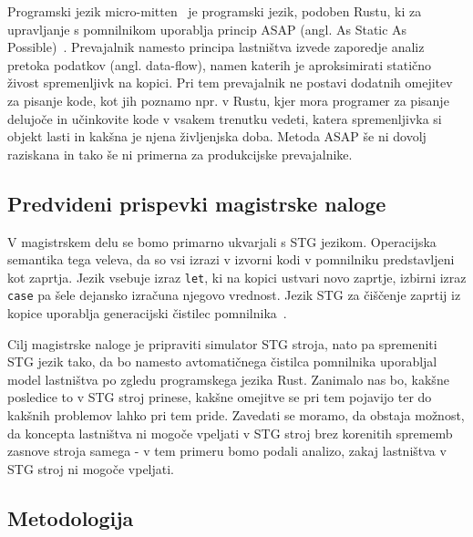 \documentclass[a4paper, 12pt]{article}
\begin{document}

Programski jezik micro-mitten~\cite{corbyn:practical-static-memory-management} je programski jezik, podoben Rustu, ki za upravljanje s pomnilnikom uporablja princip ASAP (angl. As Static As Possible)~\cite{proust2017asap}. Prevajalnik namesto principa lastništva izvede zaporedje analiz pretoka podatkov (angl. data-flow), namen katerih je aproksimirati statično živost spremenljivk na kopici. Pri tem prevajalnik ne postavi dodatnih omejitev za pisanje kode, kot jih poznamo npr. v Rustu, kjer mora programer za pisanje delujoče in učinkovite kode v vsakem trenutku vedeti, katera spremenljivka si objekt lasti in kakšna je njena življenjska doba. Metoda ASAP še ni dovolj raziskana in tako še ni primerna za produkcijske prevajalnike.

\subsection{Predvideni prispevki magistrske naloge}

V magistrskem delu se bomo primarno ukvarjali s STG jezikom. Operacijska semantika tega veleva, da so vsi izrazi v izvorni kodi v pomnilniku predstavljeni kot zaprtja. Jezik vsebuje izraz \texttt{let}, ki na kopici ustvari novo zaprtje, izbirni izraz \texttt{case} pa šele dejansko izračuna njegovo vrednost. Jezik STG za čiščenje zaprtij iz kopice uporablja generacijski čistilec pomnilnika~\cite{jones1992implementing, marlow2004making}. 

Cilj magistrske naloge je pripraviti simulator STG stroja, nato pa spremeniti STG jezik tako, da bo namesto avtomatičnega čistilca pomnilnika uporabljal model lastništva po zgledu programskega jezika Rust. Zanimalo nas bo, kakšne posledice to v STG stroj prinese, kakšne omejitve se pri tem pojavijo ter do kakšnih problemov lahko pri tem pride. Zavedati se moramo, da obstaja možnost, da koncepta lastništva ni mogoče vpeljati v STG stroj brez korenitih sprememb zasnove stroja samega - v tem primeru bomo podali analizo, zakaj lastništva v STG stroj ni mogoče vpeljati.

\subsection{Metodologija}

\end{document}
